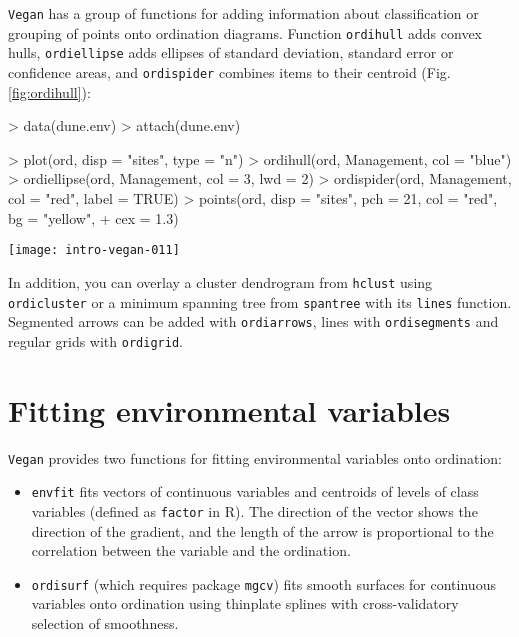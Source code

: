 \documentclass[a4paper,10pt]{amsart}
\begin{document}
\texttt{Vegan} has a group of functions for adding information about
classification or grouping of points onto ordination diagrams.
Function \texttt{ordihull} adds convex hulls, \texttt{ordiellipse}
adds ellipses of standard deviation, standard error or confidence
areas, and \texttt{ordispider} combines items to their centroid
(Fig. \ref{fig:ordihull}):
\begin{Schunk}
\begin{Sinput}
> data(dune.env)
> attach(dune.env)
\end{Sinput}
\end{Schunk}
\begin{Schunk}
\begin{Sinput}
> plot(ord, disp = "sites", type = "n")
> ordihull(ord, Management, col = "blue")
> ordiellipse(ord, Management, col = 3, lwd = 2)
> ordispider(ord, Management, col = "red", label = TRUE)
> points(ord, disp = "sites", pch = 21, col = "red", bg = "yellow", 
+     cex = 1.3)
\end{Sinput}
\end{Schunk}
\begin{SCfigure}
\texttt{[image: intro-vegan-011]}
\caption{Convex hull, standard error ellipse and a spider web diagram
  for Management levels in ordination.}
\label{fig:ordihull}
\end{SCfigure}
In addition, you can overlay a cluster dendrogram from \texttt{hclust}
using \texttt{ordicluster} or a minimum spanning tree from
\texttt{spantree} with its \texttt{lines} function.  Segmented arrows
can be added with \texttt{ordiarrows}, lines with
\texttt{ordisegments} and regular grids with \texttt{ordigrid}.

\section{Fitting environmental variables}

\texttt{Vegan} provides two functions for fitting environmental
variables onto ordination:
\begin{itemize}
\item \texttt{envfit} fits vectors of continuous variables and
  centroids of levels of class variables (defined as \texttt{factor}
  in \textsf{R}).  The direction of the vector shows the direction of
  the gradient, and the length of the arrow is proportional to the
  correlation between the variable and the ordination.
\item \texttt{ordisurf} (which requires package \texttt{mgcv}) fits
  smooth surfaces for continuous variables onto ordination using
  thinplate splines with cross-validatory selection of smoothness.
\end{itemize}
\end{document}
